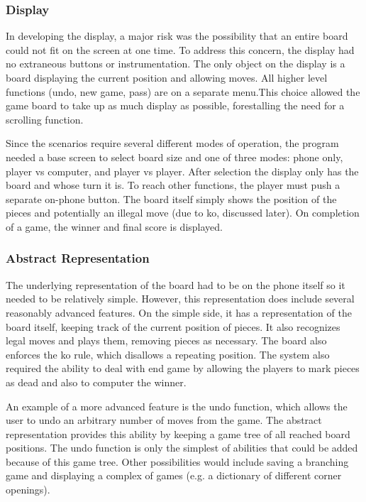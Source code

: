 \documentclass[acmtocl]{acmtrans2m}
\begin{document}
\subsubsection{Display}
In developing the display, a major risk was the possibility that an entire board could not fit on the screen at one time.  To address this concern, the display had no extraneous buttons or instrumentation.  The only object on the display is a board displaying the current position and allowing moves.  All higher level functions (undo, new game, pass) are on a separate menu.This choice allowed the game board to take up as much display as possible, forestalling the need for a scrolling function.  

Since the scenarios require several different modes of operation, the program needed a base screen to select board size and one of three modes: phone only, player vs computer, and player vs player.  After selection the display only has the board and whose turn it is.  To reach other functions, the player must push a separate on-phone button.  The board itself simply shows the position of the pieces and potentially an illegal move (due to ko, discussed later).  On completion of a game, the winner and final score is displayed.  

\subsubsection{Abstract Representation}
The underlying representation of the board had to be on the phone itself so it needed to be relatively simple.  However, this representation does include several reasonably advanced features.  On the simple side, it has a representation of the board itself, keeping track of the current position of pieces.  It also recognizes legal moves and plays them, removing pieces as necessary.  The board also enforces the ko rule, which disallows a repeating position.  The system also required the ability to deal with end game by allowing the players to mark pieces as dead and also to computer the winner.    

An example of a more advanced feature is the undo function, which allows the user to undo an arbitrary number of moves from the game.  The abstract representation provides this ability by keeping a game tree of all reached board positions.  The undo function is only the simplest of abilities that could be added because of this game tree.  Other possibilities would include saving a branching game and displaying a complex of games (e.g. a dictionary of different corner openings).
\end{document}
